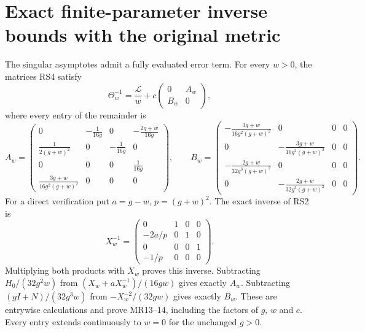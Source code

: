 \documentclass[11pt]{article}
\begin{document}
\section{Exact finite-parameter inverse bounds with the original metric}
The singular asymptotes admit a fully evaluated error term.
For every $w>0$, the matrices RS4 satisfy
\begin{equation}
 \Theta_w^{-1}=\frac{\mathscr L}{w}
       +c\begin{pmatrix}0&A_w\\B_w&0\end{pmatrix},
 \tag{MR13}
\end{equation}
where every entry of the remainder is
\begin{equation}
 A_w=\begin{pmatrix}
 0&-\frac1{16g}&0&-\frac{2g+w}{16g}\\
 \frac1{2(g+w)^2}&0&-\frac1{16g}&0\\
 0&0&0&\frac1{16g}\\
 \frac{3g+w}{16g^2(g+w)^2}&0&0&0
 \end{pmatrix},\qquad
 B_w=\begin{pmatrix}
 -\frac{3g+w}{16g^2(g+w)^2}&0&0&0\\
 0&-\frac{3g+w}{16g^2(g+w)^2}&0&0\\
 -\frac{2g+w}{32g^3(g+w)^2}&0&0&0\\
 0&-\frac{2g+w}{32g^3(g+w)^2}&0&0
 \end{pmatrix}.
 \tag{MR14}
\end{equation}
For a direct verification put $a=g-w$, $p=(g+w)^2$.
The exact inverse of RS2 is
\begin{equation}
 X_w^{-1}=\begin{pmatrix}
 0&1&0&0\\-2a/p&0&1&0\\0&0&0&1\\-1/p&0&0&0
 \end{pmatrix}.
 \tag{MR15}
\end{equation}
Multiplying both products with $X_w$ proves this inverse.
Subtracting $H_0/(32g^2w)$ from
$(X_w+aX_w^{-1})/(16gw)$ gives exactly $A_w$.
Subtracting $(gI+N)/(32g^3w)$ from
$-X_w^{-2}/(32gw)$ gives exactly $B_w$.
These are entrywise calculations and prove MR13--14, including
the factors of $g$, $w$ and $c$. Every entry extends continuously
to $w=0$ for the unchanged $g>0$.
\end{document}
